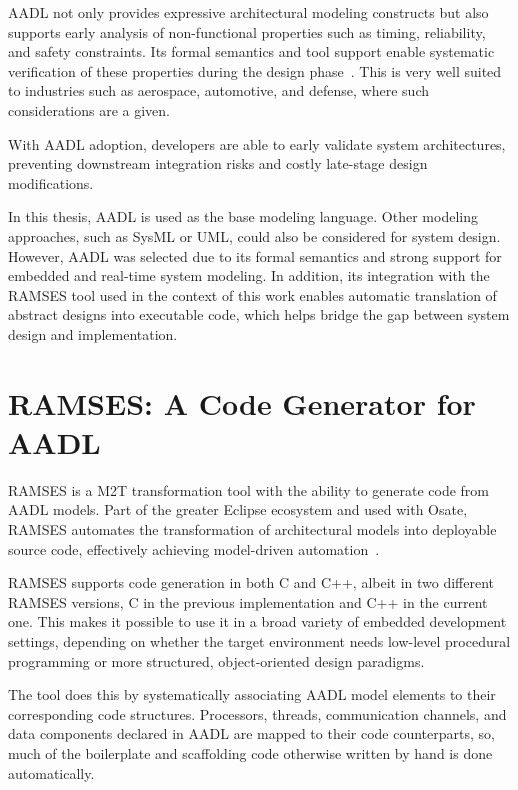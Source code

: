 \gls{AADL} not only provides expressive architectural modeling constructs but also supports early analysis of non-functional properties such as timing, reliability, and safety constraints. Its formal semantics and tool support enable systematic verification of these properties during the design phase~\cite{Feiler_Lewis_Vestal_2006}. This is very well suited to industries such as aerospace, automotive, and defense, where such considerations are a given.


\begin{tcolorbox}[colback=green!5, colframe=green!40!black] 
	With \gls{AADL} adoption, developers are able to early validate system architectures, preventing downstream integration risks and costly late-stage design modifications.  
\end{tcolorbox}


In this thesis, \gls{AADL} is used as the base modeling language. Other modeling approaches, such as SysML or UML, could also be considered for system design. However, \gls{AADL} was selected due to its formal semantics and strong support for embedded and real-time system modeling. In addition, its integration with the \gls{RAMSES} tool used in the context of this work enables automatic translation of abstract designs into executable code, which helps bridge the gap between system design and implementation.


\section{RAMSES: A Code Generator for AADL} 
\label{sec:ramses}
\label{sec:ramsesIntro}

\gls{RAMSES} is a \gls{M2T} transformation tool with the ability to generate code from \gls{AADL} models. Part of the greater Eclipse ecosystem and used with \gls{Osate}, \gls{RAMSES} automates the transformation of architectural models into deployable source code, effectively achieving model-driven automation~\cite{MEM4CSD}.
 
\gls{RAMSES} supports code generation in both C and C++, albeit in two different \gls{RAMSES} versions, C in the previous implementation and C++ in the current one. This makes it possible to use it in a broad variety of embedded development settings, depending on whether the target environment needs low-level procedural programming or more structured, object-oriented design paradigms.
 
The tool does this by systematically associating \gls{AADL} model elements to their corresponding code structures. Processors, threads, communication channels, and data components declared in \gls{AADL} are mapped to their code counterparts, so, much of the \gls{boilerplate} and \gls{scaffolding} code otherwise written by hand is done automatically.


